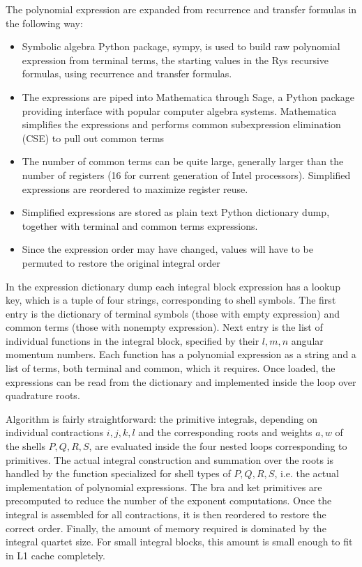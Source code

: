 \documentclass[12pt]{article}
\begin{document}
The polynomial expression are expanded from recurrence and transfer formulas in
the following way:
\begin{itemize}
\item Symbolic algebra Python package, sympy, is used to build raw
  polynomial expression from terminal terms, the starting values in the Rys
  recursive formulas, using recurrence and transfer formulas.
\item The expressions are piped into Mathematica through Sage, a Python package
  providing interface with popular computer algebra systems.  Mathematica
  simplifies the expressions and performs common subexpression elimination (CSE)
  to pull out common terms
\item The number of common terms can be quite large, generally larger than the
  number of registers (16 for current generation of Intel processors).
  Simplified expressions are reordered to maximize register reuse.
\item Simplified expressions are stored as plain text Python dictionary dump,
  together with terminal and common terms expressions.
\item Since the expression order may have changed, values will have to be
  permuted to restore the original integral order
\end{itemize}

In the expression dictionary dump each integral block expression has a
lookup key, which is a tuple of four strings, corresponding to shell
symbols.  The first entry is the dictionary of terminal symbols (those
with empty expression) and common terms (those with nonempty
expression).  Next entry is the list of individual functions in the
integral block, specified by their $l,m,n$ angular momentum numbers.
Each function has a polynomial expression as a string and a list of
terms, both terminal and common, which it requires.  Once loaded, the
expressions can be read from the dictionary and implemented inside the
loop over quadrature roots.

Algorithm is fairly straightforward: the primitive integrals,
depending on individual contractions $i,j,k,l$ and the corresponding
roots and weights $a, w$ of the shells $P,Q,R,S$, are evaluated inside
the four nested loops corresponding to primitives.  The actual integral construction and summation
over the roots is handled by the function specialized for shell types
of $P,Q,R,S$, i.e. the actual implementation of polynomial
expressions.  The bra and ket primitives are precomputed to reduce the
number of the exponent computations.  Once the integral is assembled
for all contractions, it is then reordered to restore the correct
order.  Finally, the amount of memory required is dominated by the
integral quartet size.  For small integral blocks, this amount is
small enough to fit in L1 cache completely.
\end{document}
